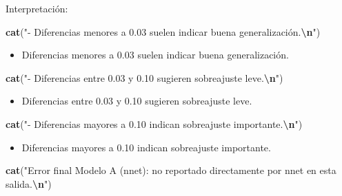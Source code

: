 \documentclass[
]{article}
\newenvironment{Shaded}{\begin{snugshade}}{\end{snugshade}}
\newcommand{\FunctionTok}[1]{\textcolor[rgb]{0.13,0.29,0.53}{\textbf{#1}}}
\newcommand{\NormalTok}[1]{#1}
\newcommand{\SpecialCharTok}[1]{\textcolor[rgb]{0.81,0.36,0.00}{\textbf{#1}}}
\newcommand{\StringTok}[1]{\textcolor[rgb]{0.31,0.60,0.02}{#1}}
\providecommand{\tightlist}{%
  \setlength{\itemsep}{0pt}\setlength{\parskip}{0pt}}
\begin{document}
Interpretación:

\begin{Shaded}
\begin{Highlighting}[]
\FunctionTok{cat}\NormalTok{(}\StringTok{"{-} Diferencias menores a 0.03 suelen indicar buena generalización.}\SpecialCharTok{\textbackslash{}n}\StringTok{"}\NormalTok{)}
\end{Highlighting}
\end{Shaded}

\begin{itemize}
\tightlist
\item
  Diferencias menores a 0.03 suelen indicar buena generalización.
\end{itemize}

\begin{Shaded}
\begin{Highlighting}[]
\FunctionTok{cat}\NormalTok{(}\StringTok{"{-} Diferencias entre 0.03 y 0.10 sugieren sobreajuste leve.}\SpecialCharTok{\textbackslash{}n}\StringTok{"}\NormalTok{)}
\end{Highlighting}
\end{Shaded}

\begin{itemize}
\tightlist
\item
  Diferencias entre 0.03 y 0.10 sugieren sobreajuste leve.
\end{itemize}

\begin{Shaded}
\begin{Highlighting}[]
\FunctionTok{cat}\NormalTok{(}\StringTok{"{-} Diferencias mayores a 0.10 indican sobreajuste importante.}\SpecialCharTok{\textbackslash{}n}\StringTok{"}\NormalTok{)}
\end{Highlighting}
\end{Shaded}

\begin{itemize}
\tightlist
\item
  Diferencias mayores a 0.10 indican sobreajuste importante.
\end{itemize}

\begin{Shaded}
\begin{Highlighting}[]
\FunctionTok{cat}\NormalTok{(}\StringTok{"Error final Modelo A (nnet): no reportado directamente por \textquotesingle{}nnet\textquotesingle{} en esta salida.}\SpecialCharTok{\textbackslash{}n}\StringTok{"}\NormalTok{)}
\end{Highlighting}
\end{Shaded}
\end{document}
